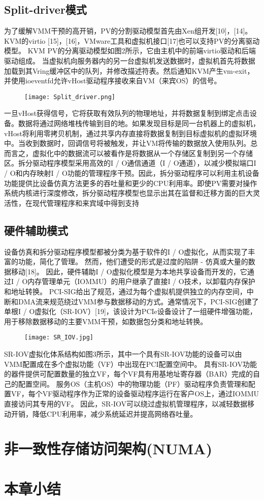 \subsection{Split-driver模式}
为了缓解VMM干预的高开销，PV的分割驱动模型首先由Xen组开发[10]，[14]。 KVM的virtio [15]，[16]，VMware工具和虚拟机接口[17]也可以支持PV的分离驱动模型。 KVM PV的分离驱动模型如图2所示，它由主机中的前端virtio驱动和后端驱动组成。 当虚拟机向服务器内的另一台虚拟机发送数据时，虚拟机首先将数据加载到其Vring缓冲区中的队列，并修改描述符表。然后通知KVM产生vm-exit，并使用ioeventfd允许vHost驱动程序接收来自VM（来宾OS）的信号。
\begin{figure}[!htp]
	\centering
	\texttt{[image: Split\_driver.png]}
\end{figure}
一旦vHost获得信号，它将获取有效队列的物理地址，并将数据复制到绑定点击设备。数据将通过网络堆栈传输到目的地。如果发现目标是同一台机器上的虚拟机，vHost将利用零拷贝机制，通过共享内存直接将数据复制到目标虚拟机的虚拟环境中。当收到数据时，回调信号将被触发，并让VM将传输的数据放入使用队列。总而言之，虚拟化中的数据流可以被看作是将数据从一个存储区复制到另一个存储区。拆分驱动程序模型采用高效的I / O通信通道（I / O通道），以减少模拟端口I / O和内存映射I / O功能的管理程序干预。因此，拆分驱动程序可以利用主机设备功能提供比设备仿真方法更多的吞吐量和更少的CPU利用率。即使PV需要对操作系统内核进行深度修改，拆分驱动程序模型也显示出其在监督和迁移方面的巨大灵活性，在现代管理程序和来宾域中得到支持


\subsection{硬件辅助模式}
设备仿真和拆分驱动程序模型都被分类为基于软件的I / O虚拟化，从而实现了丰富的功能，简化了管理。 然而，他们遭受的形式是过度的陷阱 - 仿真或大量的数据移动[18]。 因此，硬件辅助I / O虚拟化模型是为本地共享设备而开发的，它通过I / O内存管理单元（IOMMU）的用户继承了直接I / O技术，以卸载内存保护和地址转换。 PCI-SIG给出了规范，通过为每个虚拟机提供独立的内存空间，中断和DMA流来规范绕过VMM参与数据移动的方式。通常情况下，PCI-SIG创建了单根I / O虚拟化（SR-IOV）[19]，该设计为PCIe设备设计了一组硬件增强功能，用于移除数据移动的主要VMM干预，如数据包分类和地址转换。
\begin{figure}[!htp]
	\centering
	\texttt{[image: SR\_IOV.jpg]}
\end{figure}
SR-IOV虚拟化体系结构如图3所示，其中一个具有SR-IOV功能的设备可以由VMM配置成在多个虚拟功能（VF）中出现在PCI配置空间中。 具有SR-IOV功能的器件提供可配置数量的独立VF，每个VF具有用基地址寄存器（BAR）完成的自己的配置空间。 服务OS（主机OS）中的物理功能（PF）驱动程序负责管理和配置VF，每个VF驱动程序作为正常的设备驱动程序运行在客户OS上，通过IOMMU直接访问其专用的VF。 因此，SR-IOV可以绕过虚拟机管理程序，以减轻数据移动开销，降低CPU利用率，减少系统延迟并提高网络吞吐量。


\section{非一致性存储访问架构(NUMA)}


\section{本章小结}